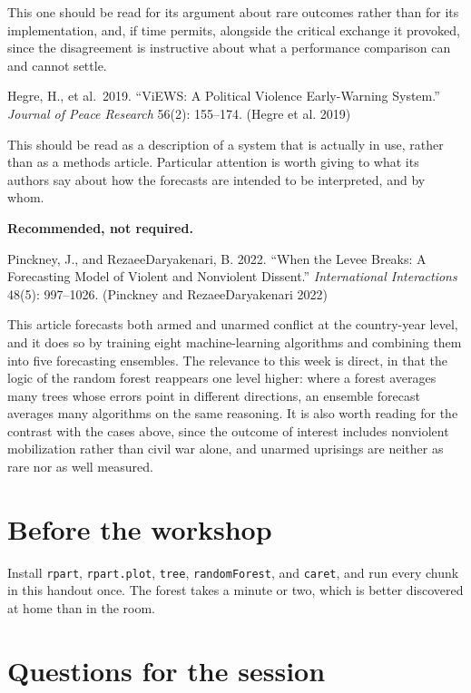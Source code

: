 \documentclass[
  a4paper,
]{scrbook}
\begin{document}
This one should be read for its argument about rare outcomes rather than
for its implementation, and, if time permits, alongside the critical
exchange it provoked, since the disagreement is instructive about what a
performance comparison can and cannot settle.

Hegre, H., et al.~2019. ``ViEWS: A Political Violence Early-Warning
System.'' \emph{Journal of Peace Research} 56(2): 155--174. ({Hegre et
al.} 2019)

This should be read as a description of a system that is actually in
use, rather than as a methods article. Particular attention is worth
giving to what its authors say about how the forecasts are intended to
be interpreted, and by whom.

\textbf{Recommended, not required.}

Pinckney, J., and RezaeeDaryakenari, B. 2022. ``When the Levee Breaks: A
Forecasting Model of Violent and Nonviolent Dissent.''
\emph{International Interactions} 48(5): 997--1026. (Pinckney and
RezaeeDaryakenari 2022)

This article forecasts both armed and unarmed conflict at the
country-year level, and it does so by training eight machine-learning
algorithms and combining them into five forecasting ensembles. The
relevance to this week is direct, in that the logic of the random forest
reappears one level higher: where a forest averages many trees whose
errors point in different directions, an ensemble forecast averages many
algorithms on the same reasoning. It is also worth reading for the
contrast with the cases above, since the outcome of interest includes
nonviolent mobilization rather than civil war alone, and unarmed
uprisings are neither as rare nor as well measured.

\section{Before the workshop}\label{before-the-workshop-1}

Install \texttt{rpart}, \texttt{rpart.plot}, \texttt{tree},
\texttt{randomForest}, and \texttt{caret}, and run every chunk in this
handout once. The forest takes a minute or two, which is better
discovered at home than in the room.

\section{Questions for the session}\label{questions-for-the-session-2}
\end{document}
